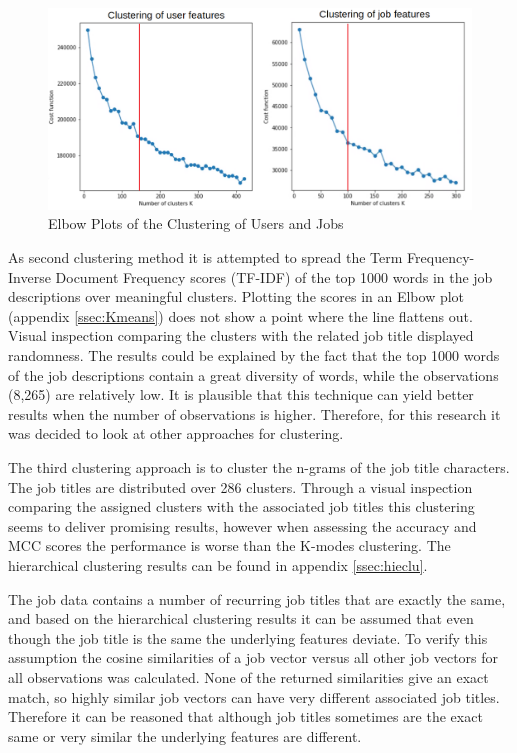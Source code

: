 \begin{figure}[H]
    \centering
    \includegraphics[width=\linewidth]{ThesisTemplate/Images/Clustering.png}
    \caption{\label{fig:eb} \footnotesize{Elbow Plots of the Clustering of Users and Jobs}}
\end{figure}

As second clustering method it is attempted to spread the Term Frequency-Inverse Document Frequency scores (TF-IDF) of the top 1000 words in the job descriptions over meaningful clusters.
Plotting the scores in an Elbow plot (appendix \ref{ssec:Kmeans}) does not show a point where the line flattens out.
Visual inspection comparing the clusters with the related job title displayed randomness.
The results could be explained by the fact that the top 1000 words of the job descriptions contain a great diversity of words, while the observations (8,265) are relatively low.
It is plausible that this technique can yield better results when the number of observations is higher.
Therefore, for this research it was decided to look at other approaches for clustering.

The third clustering approach is to cluster the n-grams of the job title characters.
The job titles are distributed over 286 clusters. 
Through a visual inspection comparing the assigned clusters with the associated job titles this clustering seems to deliver promising results, however when assessing the accuracy and MCC scores the performance is worse than the K-modes clustering.
The hierarchical clustering results can be found in appendix \ref{ssec:hieclu}.

The job data contains a number of recurring job titles that are exactly the same, and based on the hierarchical clustering results it can be assumed that even though the job title is the same the underlying features deviate. 
To verify this assumption the cosine similarities of a job vector versus all other job vectors for all observations was calculated.
None of the returned similarities give an exact match, so highly similar job vectors can have very different associated job titles.
Therefore it can be reasoned that although job titles sometimes are the exact same or very similar the underlying features are different.


